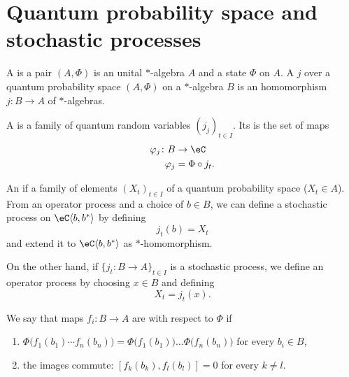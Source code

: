 \section{Quantum probability space and stochastic processes}

A  is a pair $(A,\Phi)$ is an unital $*$-algebra $A$ and a state $\Phi$ on $A$. A  $j$ over a quantum probability space $(A,\Phi)$ on a $*$-algebra $B$ is an homomorphism $j\colon B\to A$ of $*$-algebras.

A  is a family of quantum random variables $(j_j)_{t\in I}$. Its  is the set of maps
\begin{equation}
    \begin{aligned}
        \varphi_j\colon B&\to \eC \\
        \varphi_j&=\Phi\circ j_t.
    \end{aligned}
\end{equation}

An  if a family of elements $(X_t)_{t\in I}$ of a quantum probability space ($X_t\in A$). From an operator process and a choice of $b\in B$, we can define a stochastic process on $\eC\langle b,b^*\rangle$ by defining
\begin{equation}
    j_t(b)=X_t
\end{equation}
and extend it to $\eC\langle b,b^*\rangle$ as $*$-homomorphism.

On the other hand, if $\{ j_t\colon B\to A \}_{t\in I}$ is a stochastic process, we define an operator process by choosing $x\in B$ and defining
\begin{equation}
    X_t=j_t(x).
\end{equation}

\begin{definition}
    We say that maps $f_i\colon B\to A$ are  with respect to $\Phi$ if
    \begin{enumerate}
        \item
            $\Phi\big( f_1(b_1)\cdots f_n(b_n) \big)=\Phi\big( f_1(b_1) \big)\ldots\Phi\big( f_n(b_n) \big)$ for every $b_i\in B$,
        \item
            the images commute: $[f_k(b_k),f_l(b_l)]=0$ for every $k\neq l$.
    \end{enumerate}
\end{definition}

